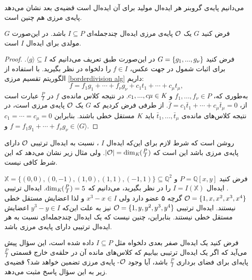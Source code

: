 می‌دانیم پایه‌ی گروبنر هر ایده‌ال مولید برای آن ایده‌ال است قضیه‌ی بعد نشان می‌دهد پایه‌ی مرزی هم چنین است.

\begin{theorem}
فرض کنید 
$G$
یک 
${\mathcal O}$
پایه‌ی مرزی ایده‌ال چندجمله‌ای 
$I\subseteq P$
باشد. در این‌صورت 
$G$
مولدی برای ایده‌ال 
$I$
است.
\end{theorem}
\begin{proof}
فرض کنید 
$G = \{g_{1},...,g_{\nu}\}$
در این‌صورت طبق تعریف می‌دانیم که 
$\langle g\rangle\subseteq I$.
برای اثبات شمول در جهت عکس، 
$f\in I$
را دلخواه در نظر بگیرید. با استفاده از الگوریتم تقسیم مرزی
\ref{borderdivision alg}
داریم:
$$f = f_{1}g_{1}+\cdots+f_{\nu}g_{\nu} + c_{1}t_{1} + \cdots + c_{\mu}t_{\mu},$$
به‌طوری که، 
$f_{1},...,f_{\nu}\in P$
و
$c_{1},...,c{\mu}\in\textit{K}$.
در نتیجه کلاس مانده‌ی 
$f$
در 
$\frac{P}{I}$
عبارت است از، 
$\bar{f} = c_{1}\bar{t}_{1}+\cdots + c_{\mu}\bar{t}_{\mu} = 0$.
از طرفی فرض کردیم که 
$G$
یک 
${\mathcal O}$
پایه‌ی مرزی است، در نتیجه کلاس‌های مانده‌ی 
$\bar{t}_{1},...,\bar{t}_{\mu}$
باید 
$\textit{K}$
مستقل خطی باشند. بنابراین 
$c_{1}=\cdots=c_{\mu} = 0$
و
$f = f_{1}g_{1}+\cdots+f_{\nu}g_{\nu}\in \langle G\rangle$.
\end{proof}
 
روشن است که شرط لازم برای این‌که ایده‌ال 
$I$
، نسبت به ایده‌ال ترتیبی 
${\mathcal O}$
دارای پایه‌ی مرزی باشد این است که 
$|{\mathcal O}| = \dim_{\textit{K}}(\frac{P}{I})$.
ولی مثال زیر نشان می‌دهد که این شرط کافی نیست. 
\begin{example}
فرض کنید 
$P = \mathbb{Q}[x,y]$
و 
$\mathbb{X} = \{(0,0),(0,-1),(1,0),(1,1),(-1,1)\}\subseteq \mathbb{Q}^{2}$.
ایده‌ال 
$I = I(\mathbb{X})$
را در نظر بگیرید، می‌دانیم که 
$\dim_{\textit{K}}(\frac{P}{I}) = 5$.
ایده‌ال ترتیبی 
${\mathcal O} = \{1,x,x^{2},x^{3},x^{4}\}$
گرچه ۵ عضو دارد ولی 
$x^{3} - x\in I$
و لذا اعضایش مستقل خطی نیستند. ایده‌ال ترتیبی 
${\mathcal O} = \{1,y,y^{2},y^{3},y^{4}\}$
نیز به علت این‌که 
$y^{3} - y\in I$
اعضایش مستقل خطی نیستند. بنابراین، چنین نیست که یک ایده‌ال چندجمله‌ای نسبت به هر ایده‌ال ترتیبی دارای پایه‌ی مرزی باشد.
\end{example}

فرض کنید یک ایده‌ال صفر بعدی دلخواه مثل 
$I\subseteq P$ 
داده شده است، این سؤال پیش می‌آید که اگر یک ایده‌ال ترتیبی بیابیم که کلاس‌های مانده آن در حلقه‌ی خارج قسمتی 
$\frac{P}{I}$
پایه‌ای برای فضای برداری 
$\frac{P}{I}$
باشد، آیا وجود 
${\mathcal O}$-
پایه‌ی مرزی تضمین خواهد شد؟ قضیه‌ی زیر به این سؤال پاسخ مثبت می‌دهد. 

